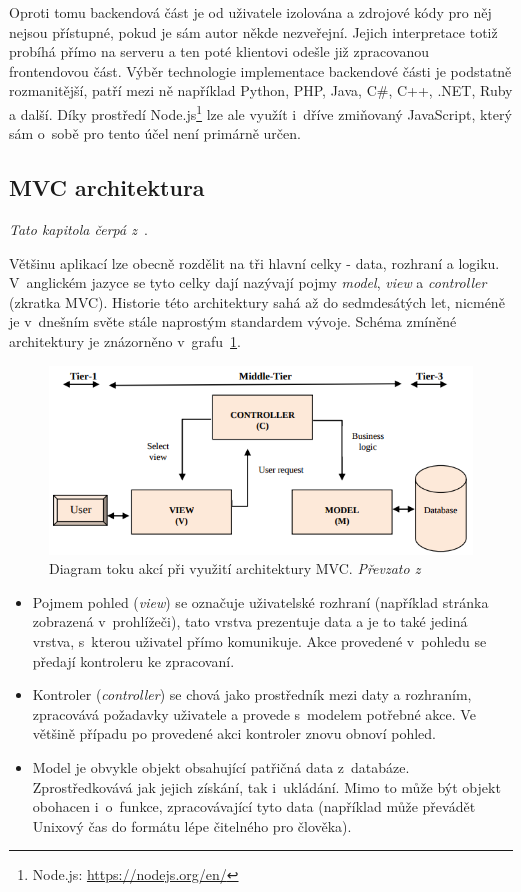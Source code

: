 Oproti tomu backendová část je od uživatele izolována a zdrojové kódy pro něj nejsou přístupné, pokud je sám autor někde nezveřejní. Jejich interpretace totiž probíhá přímo na serveru a ten poté klientovi odešle již zpracovanou frontendovou část. Výběr technologie implementace backendové části je podstatně rozmanitější, patří mezi ně například Python, PHP, Java, C\#, C++, .NET, Ruby a další. Díky prostředí Node.js\footnote{Node.js: \url{https://nodejs.org/en/}} lze ale využít i~dříve zmiňovaný JavaScript, který sám o~sobě pro tento účel není primárně určen. 


\subsection{MVC architektura}
\emph{Tato kapitola čerpá z~\cite{bib:mvc}}.

Většinu aplikací lze obecně rozdělit na tři hlavní celky - data, rozhraní a logiku. V~anglickém jazyce se tyto celky dají nazývají pojmy \emph{model}, \emph{view} a \emph{controller} (zkratka MVC). Historie této architektury sahá až do sedmdesátých let, nicméně je v~dnešním světe stále naprostým standardem vývoje. Schéma zmíněné architektury je znázorněno v~grafu~\ref{img:mvc}.

\begin{figure}[H]
	\centering
	\includegraphics[width=\textwidth]{obrazky-figures/mvc.png}
	\caption{Diagram toku akcí při využití architektury MVC. \emph{Převzato z~\cite{bib:mvc}}}
	\label{img:mvc}
\end{figure}

\begin{itemize}
\item Pojmem pohled (\emph{view}) se označuje uživatelské rozhraní (například stránka zobrazená v~prohlížeči), tato vrstva prezentuje data a je to také jediná vrstva, s~kterou uživatel přímo komunikuje. Akce provedené v~pohledu se předají kontroleru ke zpracovaní.
\item Kontroler (\emph{controller}) se chová jako prostředník mezi daty a rozhraním, zpracovává požadavky uživatele a provede s~modelem potřebné akce. Ve většině případu po provedené akci kontroler znovu obnoví pohled.
\item Model je obvykle objekt obsahující patřičná data z~databáze. Zprostředkovává jak jejich získání, tak i~ukládání. Mimo to může být objekt obohacen i~o~funkce, zpracovávající tyto data (například může převádět Unixový čas do formátu lépe čitelného pro člověka). 
\end{itemize}


